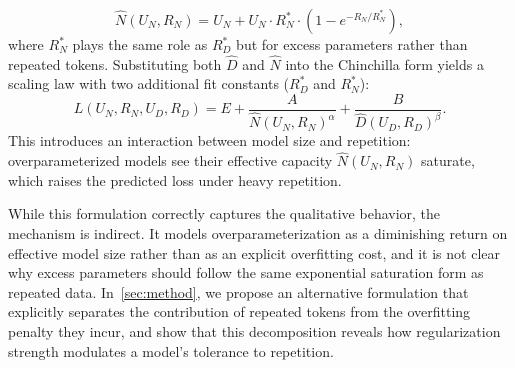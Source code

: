 \begin{equation}
    \widehat{N}(U_N, R_N) = U_N + U_N \cdot R_N^* \cdot \left(1 - e^{-R_N / R_N^*}\right),
    \label{eq:muennighoff_neff}
\end{equation}
where $R_N^*$ plays the same role as $R_D^*$ but for excess parameters rather than repeated tokens. Substituting both $\widehat{D}$ and $\widehat{N}$ into the Chinchilla form yields a scaling law with two additional fit constants ($R_D^*$ and $R_N^*$):
\begin{equation}
    L(U_N, R_N, U_D, R_D) = E + \frac{A}{\widehat{N}(U_N, R_N)^\alpha} + \frac{B}{\widehat{D}(U_D, R_D)^\beta}.
    \label{eq:muennighoff_full}
\end{equation}
This introduces an interaction between model size and repetition: overparameterized models see their effective capacity $\widehat{N}(U_N, R_N)$ saturate, which raises the predicted loss under heavy repetition.

While this formulation correctly captures the qualitative behavior, the mechanism is indirect. It models overparameterization as a diminishing return on effective model size rather than as an explicit overfitting cost, and it is not clear why excess parameters should follow the same exponential saturation form as repeated data. In~\autoref{sec:method}, we propose an alternative formulation that explicitly separates the contribution of repeated tokens from the overfitting penalty they incur, and show that this decomposition reveals how regularization strength modulates a model's tolerance to repetition.